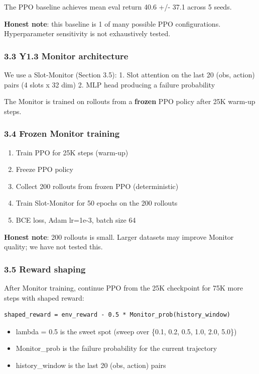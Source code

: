 \documentclass[
]{article}
\providecommand{\tightlist}{%
  \setlength{\itemsep}{0pt}\setlength{\parskip}{0pt}}
\begin{document}
The PPO baseline achieves mean eval return 40.6 +/- 37.1 across 5 seeds.

\textbf{Honest note}: this baseline is 1 of many possible PPO
configurations. Hyperparameter sensitivity is not exhaustively tested.

\subsubsection{3.3 Y1.3 Monitor
architecture}\label{y1.3-monitor-architecture}

We use a Slot-Monitor (Section 3.5): 1. Slot attention on the last 20
(obs, action) pairs (4 slots x 32 dim) 2. MLP head producing a failure
probability

The Monitor is trained on rollouts from a \textbf{frozen} PPO policy
after 25K warm-up steps.

\subsubsection{3.4 Frozen Monitor
training}\label{frozen-monitor-training}

\begin{enumerate}
\def\labelenumi{\arabic{enumi}.}
\tightlist
\item
  Train PPO for 25K steps (warm-up)
\item
  Freeze PPO policy
\item
  Collect 200 rollouts from frozen PPO (deterministic)
\item
  Train Slot-Monitor for 50 epochs on the 200 rollouts
\item
  BCE loss, Adam lr=1e-3, batch size 64
\end{enumerate}

\textbf{Honest note}: 200 rollouts is small. Larger datasets may improve
Monitor quality; we have not tested this.

\subsubsection{3.5 Reward shaping}\label{reward-shaping-1}

After Monitor training, continue PPO from the 25K checkpoint for 75K
more steps with shaped reward:

\begin{verbatim}
shaped_reward = env_reward - 0.5 * Monitor_prob(history_window)
\end{verbatim}

\begin{itemize}
\tightlist
\item
  lambda = 0.5 is the sweet spot (sweep over \{0.1, 0.2, 0.5, 1.0, 2.0,
  5.0\})
\item
  Monitor\_prob is the failure probability for the current trajectory
\item
  history\_window is the last 20 (obs, action) pairs
\end{itemize}
\end{document}
